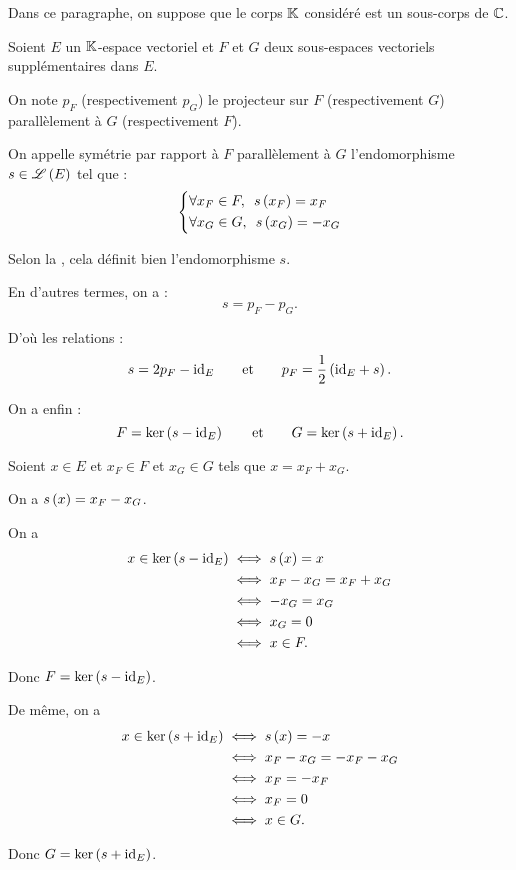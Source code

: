 Dans ce paragraphe, on suppose que le corps \(\mathbb{K}\) considéré est un sous-corps de \(\mathbb{C}\).

\begin{defprop}
Soient \(E\) un \(\mathbb{K}\)-espace vectoriel et \(F\) et \(G\) deux sous-espaces vectoriels supplémentaires dans \(E\).

On note \(p_F\) (respectivement \(p_G\)) le projecteur sur \(F\) (respectivement \(G\)) parallèlement à \(G\) (respectivement \(F\)).

On appelle symétrie par rapport à \(F\) parallèlement à \(G\) l'endomorphisme \(s\in\mathscr{L}\left(E\right)\) tel que : \[\begin{dcases}\quantifs{\forall x_F\in F}s\paren{x_F}=x_F \\ \quantifs{\forall x_G\in G}s\paren{x_G}=-x_G\end{dcases}\]

Selon la , cela définit bien l'endomorphisme \(s\).

En d'autres termes, on a : \[s=p_F-p_G.\]

D'où les relations : \[s=2p_F-\mathrm{id}_{E}\qquad\text{et}\qquad p_F=\dfrac{1}{2}\left(\mathrm{id}_{E}+s\right).\]

On a enfin : \[F=\ker\left(s-\mathrm{id}_{E}\right)\qquad\text{et}\qquad G=\ker\left(s+\mathrm{id}_{E}\right).\]
\end{defprop}

\begin{dem}
Soient \(x\in E\) et \(x_F\in F\) et \(x_G\in G\) tels que \(x=x_F+x_G\).

On a \(s\left(x\right)=x_F-x_G\).

On a \[\begin{aligned}
x\in\ker\left(s-\mathrm{id}_{E}\right)&\iff s\left(x\right)=x \\
&\iff x_F-x_G=x_F+x_G \\
&\iff-x_G=x_G \\
&\iff x_G=0 \\
&\iff x\in F.
\end{aligned}\]

Donc \(F=\ker\left(s-\mathrm{id}_{E}\right)\).

De même, on a \[\begin{aligned}
x\in\ker\left(s+\mathrm{id}_{E}\right)&\iff s\left(x\right)=-x \\
&\iff x_F-x_G=-x_F-x_G \\
&\iff x_F=-x_F \\
&\iff x_F=0 \\
&\iff x\in G.
\end{aligned}\]

Donc \(G=\ker\left(s+\mathrm{id}_{E}\right)\).
\end{dem}

